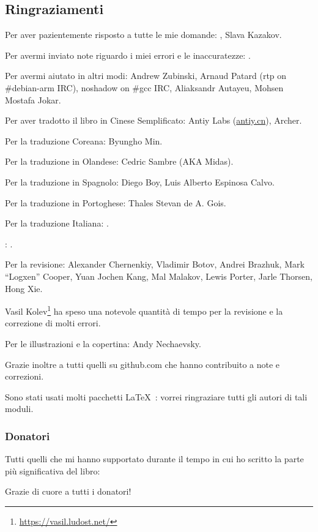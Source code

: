 \subsection*{Ringraziamenti}

Per aver pazientemente risposto a tutte le mie domande: \HERMIT, Slava  Kazakov.

Per avermi inviato note riguardo i miei errori e le inaccuratezze: \PeopleMistakesInaccuracies{}.

Per avermi aiutato in altri modi:
Andrew Zubinski,
Arnaud Patard (rtp on \#debian-arm IRC),
noshadow on \#gcc IRC,
Aliaksandr Autayeu,
Mohsen Mostafa Jokar.

Per aver tradotto il libro in Cinese Semplificato:
Antiy Labs (\href{http://antiy.cn}{antiy.cn}), Archer.

Per la traduzione Coreana: Byungho Min.

Per la traduzione in Olandese: Cedric Sambre (AKA Midas).

Per la traduzione in Spagnolo: Diego Boy, Luis Alberto Espinosa Calvo.

Per la traduzione in Portoghese: Thales Stevan de A. Gois.

Per la traduzione Italiana: \PeopleItalianTranslators{}.

\ITAph{}: \PeopleFrenchTranslators{}.

Per la revisione:
Alexander  Chernenkiy,
Vladimir Botov,
Andrei Brazhuk,
Mark ``Logxen'' Cooper, Yuan Jochen Kang, Mal Malakov, Lewis Porter, Jarle Thorsen, Hong Xie.

Vasil Kolev\footnote{\url{https://vasil.ludost.net/}} ha speso una notevole quantità di tempo per la revisione e la correzione di molti errori.

Per le illustrazioni e la copertina: Andy Nechaevsky.

Grazie inoltre a tutti quelli su github.com che hanno contribuito a note e correzioni.

Sono stati usati molti pacchetti \LaTeX\ : vorrei ringraziare tutti gli autori di tali moduli.

\subsubsection*{Donatori}

Tutti quelli che mi hanno supportato durante il tempo in cui ho scritto la parte più significativa del libro:



Grazie di cuore a tutti i donatori!
